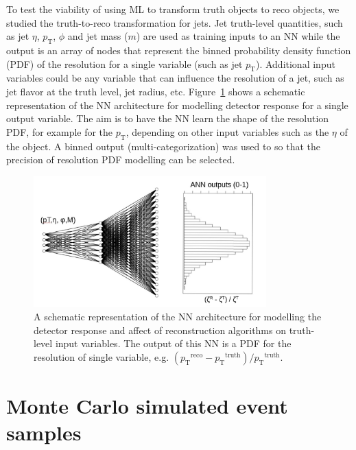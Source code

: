 \documentclass[showpacs,showkeys,preprint,prd,nofootinbib,linenumbers,12pt,superscriptaddress]{revtex4-1}
\def\pt{\ensuremath{p_{\mathrm{T}}}}
\def\ptRes{\ensuremath{(\pt^{\mathrm{reco}}-\pt^{\mathrm{truth}})/\pt^{\mathrm{truth}}}}
\begin{document}
To test the viability of using ML to transform truth objects to reco objects, we studied the truth-to-reco transformation for jets. Jet truth-level quantities, such as jet $\eta$, $\pt$, $\phi$ and jet mass ($m$) are used as training inputs to an NN while the output
is an array of nodes that represent the binned probability density function (PDF) of the resolution for a single variable (such as jet \pt). Additional input variables could be any variable that can influence the resolution of a jet, such as jet flavor at the truth level, jet radius, etc. Figure~\ref{ann_example} shows a schematic representation of the NN architecture for modelling detector response for a single output variable. The aim is to have the NN learn the shape of the resolution PDF, for example for the $\pt$, depending on other input variables such as the $\eta$ of the object. A binned output (multi-categorization) was used to so that the precision of resolution PDF modelling can be selected.

\begin{figure}[h]
  \includegraphics[width=0.8\textwidth]{figures/intro/nn_example.pdf}
  \caption{A schematic representation of the NN architecture for modelling the detector response and affect of reconstruction algorithms on truth-level input variables. The output of this NN is a PDF for the resolution of single variable, e.g. \ptRes.}
  \label{ann_example}
\end{figure}


\section{Monte Carlo simulated event samples}
\end{document}
